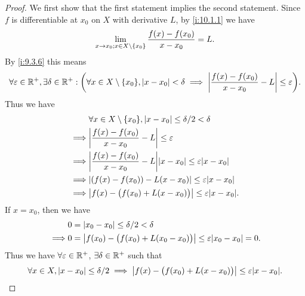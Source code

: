 \begin{proof}
  We first show that the first statement implies the second statement.
  Since \(f\) is differentiable at \(x_0\) on \(X\) with derivative \(L\), by \cref{i:10.1.1} we have
  \[
    \lim_{x \to x_0 ; x \in X \setminus \left\lbrace x_0\right\rbrace} \dfrac{f(x) - f(x_0)}{x - x_0} = L.
  \]
  By \cref{i:9.3.6} this means
  \[
    \forall \varepsilon \in \R^+, \exists \delta \in \R^+ : \bigg(\forall x \in X \setminus \set{x_0}, \abs{x - x_0} < \delta \implies \abs{\dfrac{f(x) - f(x_0)}{x - x_0} - L} \leq \varepsilon\bigg).
  \]
  Thus we have
  \begin{align*}
             & \forall x \in X \setminus \set{x_0}, \abs{x - x_0} \leq \delta / 2 < \delta           \\
    \implies & \abs{\dfrac{f(x) - f(x_0)}{x - x_0} - L} \leq \varepsilon                             \\
    \implies & \abs{\dfrac{f(x) - f(x_0)}{x - x_0} - L} \abs{x - x_0} \leq \varepsilon \abs{x - x_0} \\
    \implies & \abs{(f(x) - f(x_0)) - L(x - x_0)} \leq \varepsilon \abs{x - x_0}                     \\
    \implies & \abs{f(x) - \big(f(x_0) + L(x - x_0)\big)} \leq \varepsilon \abs{x - x_0}.
  \end{align*}
  If \(x = x_0\), then we have
  \begin{align*}
             & 0 = \abs{x_0 - x_0} \leq \delta / 2 < \delta                                             \\
    \implies & 0 = \abs{f(x_0) - \big(f(x_0) + L(x_0 - x_0)\big)} \leq \varepsilon \abs{x_0 - x_0} = 0.
  \end{align*}
  Thus we have \(\forall \varepsilon \in \mathbb{R}^+\), \(\exists \delta \in \mathbb{R}^+\) such that
  \[
    \forall x \in X, \abs{x - x_0} \leq \delta / 2 \implies \abs{f(x) - \big(f(x_0) + L(x - x_0)\big)} \leq \varepsilon \abs{x - x_0}.
  \]


\end{proof}
